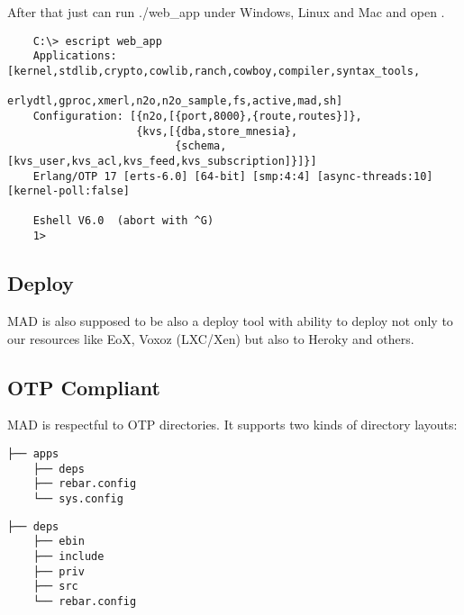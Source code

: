 After that just can run ./web_app under Windows, Linux and
Mac and open .

\vspace{1\baselineskip}
\begin{lstlisting}
    C:\> escript web_app
    Applications: [kernel,stdlib,crypto,cowlib,ranch,cowboy,compiler,syntax_tools,
                   erlydtl,gproc,xmerl,n2o,n2o_sample,fs,active,mad,sh]
    Configuration: [{n2o,[{port,8000},{route,routes}]},
                    {kvs,[{dba,store_mnesia},
                          {schema,[kvs_user,kvs_acl,kvs_feed,kvs_subscription]}]}]
    Erlang/OTP 17 [erts-6.0] [64-bit] [smp:4:4] [async-threads:10] [kernel-poll:false]

    Eshell V6.0  (abort with ^G)
    1>
\end{lstlisting}
\vspace{1\baselineskip}

\subsection{Deploy}

MAD is also supposed to be also a deploy tool with ability to
deploy not only to our resources like EoX, Voxoz (LXC/Xen) but
also to Heroky and others.

\subsection{OTP Compliant}

MAD is respectful to OTP directories. It supports two kinds of directory layouts:

\vspace{1\baselineskip}
\begin{lstlisting}[caption=Solution]
    ├── apps
    ├── deps
    ├── rebar.config
    └── sys.config
\end{lstlisting}
\vspace{1\baselineskip}

\vspace{1\baselineskip}
\begin{lstlisting}[caption=OTP Application]
    ├── deps
    ├── ebin
    ├── include
    ├── priv
    ├── src
    └── rebar.config
\end{lstlisting}
\vspace{1\baselineskip}
